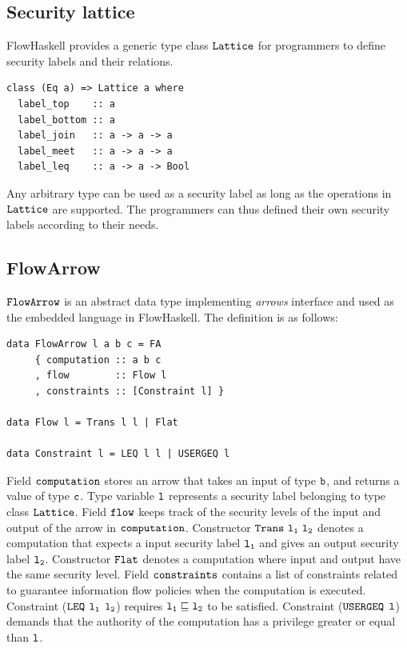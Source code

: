 \documentclass{report}
\newcommand{\co}[1]{$\cod{#1}$}
\begin{document}
\subsection{Security lattice}
\label{chap3:lattice}
FlowHaskell provides a generic type class $\mathtt{Lattice}$ for programmers to define security
labels and their relations. 
\begin{Verbatim}[fontsize=\small]
class (Eq a) => Lattice a where
  label_top    :: a
  label_bottom :: a
  label_join   :: a -> a -> a
  label_meet   :: a -> a -> a
  label_leq    :: a -> a -> Bool
\end{Verbatim}
Any arbitrary type can be used as a security label as long as the operations in $\mathtt{Lattice}$ are
supported. The programmers can thus defined their own security labels according to their needs.

\subsection{FlowArrow}
\label{chap3:flowarrow}
\co{FlowArrow} is an abstract data type implementing {\em arrows} interface and used
as the embedded language in FlowHaskell. The definition is as follows:
\begin{Verbatim}[fontsize=\small]
data FlowArrow l a b c = FA
     { computation :: a b c
     , flow        :: Flow l
     , constraints :: [Constraint l] }

data Flow l = Trans l l | Flat

data Constraint l = LEQ l l | USERGEQ l
\end{Verbatim}
Field \co{computation} stores an arrow that takes an input of type \co{b}, and returns a
value of type \co{c}. 
Type variable \co{l} represents a security label belonging to type class \co{Lattice}.
Field \co{flow} keeps track of the security levels of the input and output of the arrow 
in \co{computation}. 
Constructor $\mathtt{Trans}~\mathtt{l_1}~\mathtt{l_2}$ denotes a computation that expects a input 
security label \co{l_1} and gives an output security label \co{l_2}. Constructor
\co{Flat} denotes a computation where input and output have the same security level.
Field \co{constraints} contains a list of constraints related to guarantee information
flow policies when the computation is executed.
Constraint (\co{LEQ} \co{l_1} \co{l_2}) requires $\mathtt{l_1}\sqsubseteq\mathtt{l_2}$ to be satisfied.
Constraint (\co{USERGEQ} \co{l}) demands that the authority of the computation has
a privilege greater or equal than \co{l}.
\end{document}

